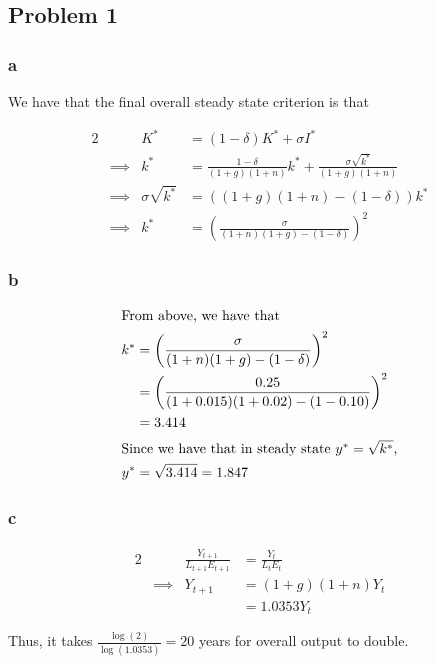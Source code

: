 \documentclass[12pt,letterpaper]{article}
\theoremstyle{definition}
\begin{document}
\subsection*{Problem 1}

\subsubsection*{a}

We have that the final overall steady state criterion is that

\begin{alignat*}{2}
  && K^* &= (1 - \delta)K^* + \sigma I^* \\
  &\implies& k^* &= \frac{1 - \delta}{(1 + g)(1 + n)}k^* + \frac{\sigma
    \sqrt{k^*}}{(1 + g)(1 + n)} \\
  &\implies& \sigma \sqrt{k^*} &= ((1 + g)(1 + n) - (1 - \delta))k^*  \\
  &\implies& k^* &= \left(\frac{\sigma}{(1 + n)(1 + g) - (1 - \delta)}\right)^2
\end{alignat*}

\subsubsection*{b}


\begin{align*}
  \intertext{From above, we have that}
  k^* &= \left(\frac{\sigma}{(1 + n)(1 + g) - (1 - \delta)}\right)^2 \\
      &= \left( \frac{0.25}{(1 + 0.015)(1 + 0.02) - (1 - 0.10)} \right)^2 \\
      &= 3.414 \\
  \intertext{Since we have that in steady state $y^* = \sqrt{k^*}$,} 
  y^* &= \sqrt{3.414} = 1.847 \\
\end{align*}

\subsubsection*{c}

\begin{alignat*}{2}
  && \frac{Y_{t+1}}{L_{t+1}E_{t+1}} &= \frac{Y_t}{L_tE_t} \\
  &\implies& Y_{t+1} &= (1 + g)(1 + n)Y_t \\
  && &= 1.0353Y_t
\end{alignat*}

Thus, it takes $\frac{\log(2)}{\log(1.0353)} = 20$ years for overall output to double.
\end{document}
